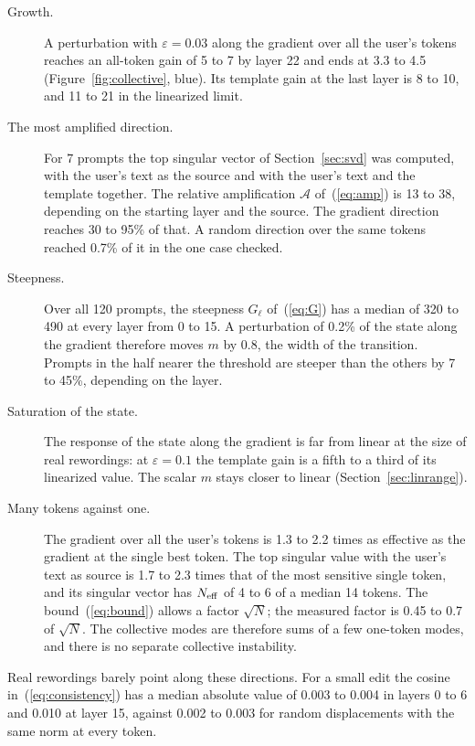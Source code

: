 \documentclass[11pt]{article}
\begin{document}
\begin{description}
\item[Growth.] A perturbation with $\varepsilon=0.03$ along the gradient over all the user's tokens reaches an all-token gain of 5 to 7 by layer 22 and ends at 3.3 to 4.5 (Figure~\ref{fig:collective}, blue). Its template gain at the last layer is 8 to 10, and 11 to 21 in the linearized limit.
\item[The most amplified direction.] For 7 prompts the top singular vector of Section~\ref{sec:svd} was computed, with the user's text as the source and with the user's text and the template together. The relative amplification $\mathcal{A}$ of~(\ref{eq:amp}) is 13 to 38, depending on the starting layer and the source. The gradient direction reaches 30 to 95\% of that. A random direction over the same tokens reached 0.7\% of it in the one case checked.
\item[Steepness.] Over all 120 prompts, the steepness $G_\ell$ of~(\ref{eq:G}) has a median of 320 to 490 at every layer from 0 to 15. A perturbation of 0.2\% of the state along the gradient therefore moves $m$ by 0.8, the width of the transition. Prompts in the half nearer the threshold are steeper than the others by 7 to 45\%, depending on the layer.
\item[Saturation of the state.] The response of the state along the gradient is far from linear at the size of real rewordings: at $\varepsilon=0.1$ the template gain is a fifth to a third of its linearized value. The scalar $m$ stays closer to linear (Section~\ref{sec:linrange}).
\item[Many tokens against one.] The gradient over all the user's tokens is 1.3 to 2.2 times as effective as the gradient at the single best token. The top singular value with the user's text as source is 1.7 to 2.3 times that of the most sensitive single token, and its singular vector has $N_{\rm eff}$ of 4 to 6 of a median 14 tokens. The bound~(\ref{eq:bound}) allows a factor $\sqrt N$; the measured factor is 0.45 to 0.7 of $\sqrt N$. The collective modes are therefore sums of a few one-token modes, and there is no separate collective instability.
\end{description}

Real rewordings barely point along these directions. For a small edit the cosine in~(\ref{eq:consistency}) has a median absolute value of 0.003 to 0.004 in layers 0 to 6 and 0.010 at layer 15, against 0.002 to 0.003 for random displacements with the same norm at every token.
\end{document}
